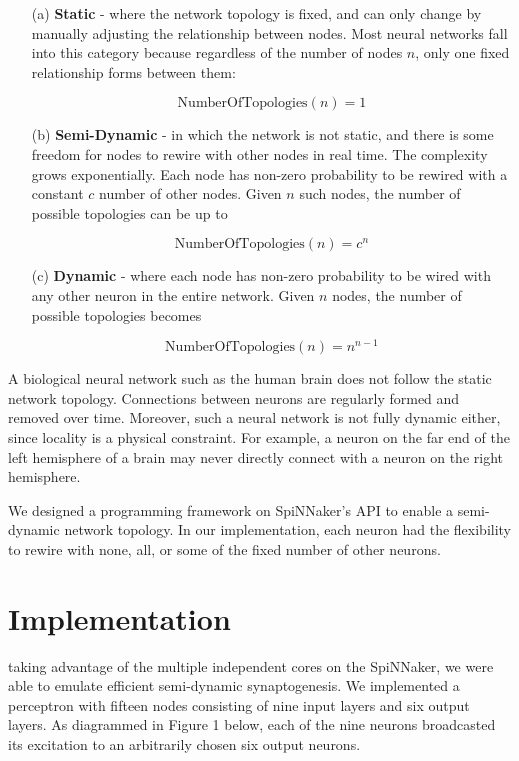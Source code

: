 \documentclass[journal]{./sty/IEEEtran}
\begin{document}
\begin{itemize}
\item[(a)] {\bf Static} - where the network topology is fixed, and can only change by manually adjusting the relationship between nodes. Most neural networks fall into this category because regardless of the number of nodes \(n\), only one fixed relationship forms between them:

\[
\text{NumberOfTopologies}(n) = 1
\]


\item[(b)] {\bf Semi-Dynamic} - in which the network is not static, and there is some freedom for nodes to rewire with other nodes in real time. The complexity grows exponentially. Each node has non-zero probability to be rewired with a constant \(c\) number of other nodes. Given \(n\) such nodes, the number of possible topologies can be up to

\[
\text{NumberOfTopologies}(n) = c^n
\]


\item[(c)] {\bf Dynamic} - where each node has non-zero probability to be wired with any other neuron in the entire network. Given \(n\) nodes, the number of possible topologies becomes

\[
\text{NumberOfTopologies}(n) = n^{n-1}
\]


\end{itemize}

A biological neural network such as the human brain does not follow the static network topology. Connections between neurons are regularly formed and removed over time. Moreover, such a neural network is not fully dynamic either, since locality is a physical constraint. For example, a neuron on the far end of the left hemisphere of a brain may never directly connect with a neuron on the right hemisphere.

We designed a programming framework on SpiNNaker's API to enable a semi-dynamic network topology. In our implementation, each neuron had the flexibility to rewire with none, all, or some of the fixed number of other neurons.

\section{Implementation}
 taking advantage of the multiple independent cores on the SpiNNaker, we were able to emulate efficient semi-dynamic synaptogenesis. We implemented a perceptron with fifteen nodes consisting of nine input layers and six output layers. As diagrammed in Figure 1 below, each of the nine neurons broadcasted its excitation to an arbitrarily chosen six output neurons. 
\end{document}
